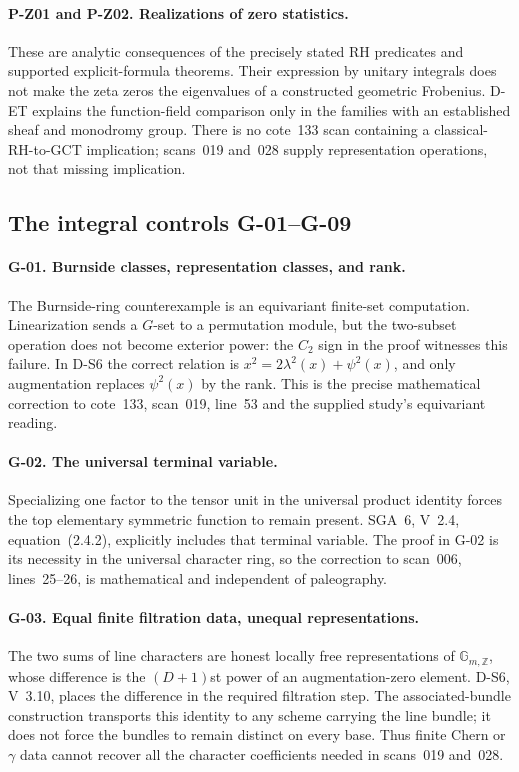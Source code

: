 \documentclass[11pt,a4paper]{article}
\theoremstyle{definition}\newtheorem{definition}{Definition}
\begin{document}
\paragraph{P-Z01 and P-Z02. Realizations of zero statistics.}
These are analytic consequences of the precisely stated RH predicates and supported explicit-formula theorems. Their expression by unitary integrals does not make the zeta zeros the eigenvalues of a constructed geometric Frobenius. D-ET explains the function-field comparison only in the families with an established sheaf and monodromy group. There is no cote~133 scan containing a classical-RH-to-GCT implication; scans~019 and~028 supply representation operations, not that missing implication.

\subsection{The integral controls G-01--G-09}

\paragraph{G-01. Burnside classes, representation classes, and rank.}
The Burnside-ring counterexample is an equivariant finite-set computation. Linearization sends a $G$-set to a permutation module, but the two-subset operation does not become exterior power: the $C_2$ sign in the proof witnesses this failure. In D-S6 the correct relation is $x^2=2\lambda^2(x)+\psi^2(x)$, and only augmentation replaces $\psi^2(x)$ by the rank. This is the precise mathematical correction to cote~133, scan~019, line~53 and the supplied study's equivariant reading.

\paragraph{G-02. The universal terminal variable.}
Specializing one factor to the tensor unit in the universal product identity forces the top elementary symmetric function to remain present. SGA~6, V~2.4, equation~(2.4.2), explicitly includes that terminal variable. The proof in G-02 is its necessity in the universal character ring, so the correction to scan~006, lines~25--26, is mathematical and independent of paleography.

\paragraph{G-03. Equal finite filtration data, unequal representations.}
The two sums of line characters are honest locally free representations of $\mathbb G_{m,\mathbb Z}$, whose difference is the $(D+1)$st power of an augmentation-zero element. D-S6, V~3.10, places the difference in the required filtration step. The associated-bundle construction transports this identity to any scheme carrying the line bundle; it does not force the bundles to remain distinct on every base. Thus finite Chern or $\gamma$ data cannot recover all the character coefficients needed in scans~019 and~028.
\end{document}
